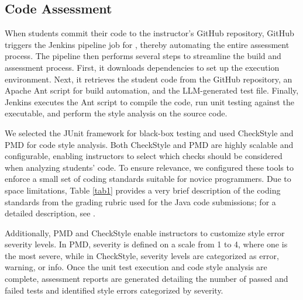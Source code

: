 \subsection{Code Assessment}
When students commit their code to the instructor’s GitHub repository, GitHub triggers the Jenkins pipeline job for \codeinspectoren, thereby automating the entire assessment process. The pipeline then performs several steps to streamline the build and assessment process. First, it downloads dependencies to set up the execution environment. Next, it retrieves the student code from the GitHub repository, an Apache Ant script for build automation, and the LLM-generated test file. Finally, Jenkins executes the Ant script to compile the code, run unit testing against the executable, and perform the style analysis on the source code.

We selected the JUnit framework for black-box testing and used CheckStyle and PMD for code style analysis. Both CheckStyle and PMD are highly scalable and configurable, enabling instructors to select which checks should be considered when analyzing students' code. To ensure relevance, we configured these tools to enforce a small set of coding standards suitable for novice programmers. Due to space limitations, Table \ref{tab1} provides a very brief description of the coding standards from the grading rubric used for the Java code submissions; for a detailed description, see \cite{10590588,Imhmed2024fosterCQ}.

Additionally, PMD and CheckStyle enable instructors to customize style error severity levels. In PMD, severity is defined on a scale from 1 to 4, where one is the most severe, while in CheckStyle, severity levels are categorized as error, warning, or info. Once the unit test execution and code style analysis are complete, assessment reports are generated detailing the number of passed and failed tests and identified style errors categorized by severity.

